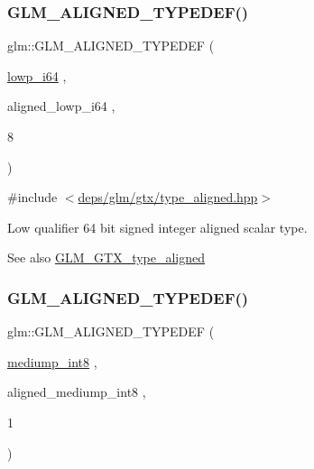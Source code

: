 \subsubsection{\texorpdfstring{G\+L\+M\+\_\+\+A\+L\+I\+G\+N\+E\+D\+\_\+\+T\+Y\+P\+E\+D\+E\+F()}{GLM\_ALIGNED\_TYPEDEF()}\hspace{0.1cm}{\footnotesize\ttfamily [12/209]}}
{\footnotesize\ttfamily glm\+::\+G\+L\+M\+\_\+\+A\+L\+I\+G\+N\+E\+D\+\_\+\+T\+Y\+P\+E\+D\+EF (\begin{DoxyParamCaption}\item[{\hyperlink{group__gtc__type__precision_ga1f4ded25f71c0f3b4518936d50b54b6e}{lowp\+\_\+i64}}]{,  }\item[{aligned\+\_\+lowp\+\_\+i64}]{,  }\item[{8}]{ }\end{DoxyParamCaption})}



{\ttfamily \#include $<$\hyperlink{gtx_2type__aligned_8hpp}{deps/glm/gtx/type\+\_\+aligned.\+hpp}$>$}

Low qualifier 64 bit signed integer aligned scalar type. \begin{DoxySeeAlso}{See also}
\hyperlink{group__gtx__type__aligned}{G\+L\+M\+\_\+\+G\+T\+X\+\_\+type\+\_\+aligned} 
\end{DoxySeeAlso}
\mbox{\label{group__gtx__type__aligned_gac8cff825951aeb54dd846037113c72db}} 
\subsubsection{\texorpdfstring{G\+L\+M\+\_\+\+A\+L\+I\+G\+N\+E\+D\+\_\+\+T\+Y\+P\+E\+D\+E\+F()}{GLM\_ALIGNED\_TYPEDEF()}\hspace{0.1cm}{\footnotesize\ttfamily [13/209]}}
{\footnotesize\ttfamily glm\+::\+G\+L\+M\+\_\+\+A\+L\+I\+G\+N\+E\+D\+\_\+\+T\+Y\+P\+E\+D\+EF (\begin{DoxyParamCaption}\item[{\hyperlink{group__gtc__type__precision_ga3ee8faab2278c44c5785af04b7b18a14}{mediump\+\_\+int8}}]{,  }\item[{aligned\+\_\+mediump\+\_\+int8}]{,  }\item[{1}]{ }\end{DoxyParamCaption})}



